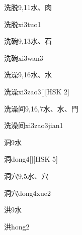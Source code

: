 \begin{Entry}{洗脱}{9,11}{⽔、⾁}
  \begin{Phonetics}{洗脱}{xi3tuo1}
  \end{Phonetics}
\end{Entry}

\begin{Entry}{洗碗}{9,13}{⽔、⽯}
  \begin{Phonetics}{洗碗}{xi3wan3}
  \end{Phonetics}
\end{Entry}

\begin{Entry}{洗澡}{9,16}{⽔、⽔}
  \begin{Phonetics}{洗澡}{xi3zao3}[][HSK 2]
  \end{Phonetics}
\end{Entry}

\begin{Entry}{洗澡间}{9,16,7}{⽔、⽔、⾨}
  \begin{Phonetics}{洗澡间}{xi3zao3jian1}
  \end{Phonetics}
\end{Entry}

\begin{Entry}{洞}{9}{⽔}
  \begin{Phonetics}{洞}{dong4}[][HSK 5]
  \end{Phonetics}
\end{Entry}

\begin{Entry}{洞穴}{9,5}{⽔、⽳}
  \begin{Phonetics}{洞穴}{dong4xue2}
  \end{Phonetics}
\end{Entry}

\begin{Entry}{洪}{9}{⽔}
  \begin{Phonetics}{洪}{hong2}
  \end{Phonetics}
\end{Entry}

